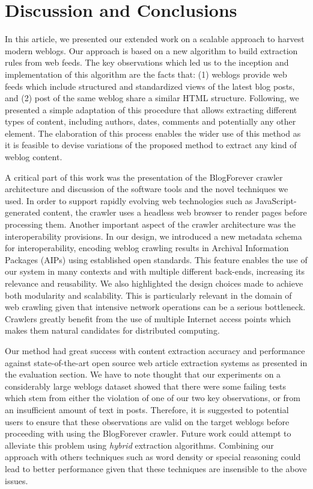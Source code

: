 \section{Discussion and Conclusions}
\label{conclusionandfuturework}
In this article, we presented our extended work on a scalable approach to 
harvest modern weblogs. Our approach is based on a new algorithm to build 
extraction rules from web feeds. The key observations which led us to 
the inception and implementation of this algorithm are the facts that: 
(1) weblogs provide web feeds which include structured and standardized 
views of the latest blog posts, and (2) post of the same weblog share 
a similar HTML structure. Following, we presented a simple adaptation 
of this procedure that allows extracting different types of content, 
including authors, dates, comments and potentially any other element. 
The elaboration of this process enables the wider use of this method 
as it is feasible to devise variations of the proposed method to extract 
any kind of weblog content.

A critical part of this work was the presentation of the BlogForever 
crawler architecture and discussion of the software tools and the novel 
techniques we used. In order to support rapidly evolving web technologies 
such as JavaScript-generated content, the crawler uses a headless web 
browser to render pages before processing them. Another important aspect 
of the crawler architecture was the interoperability provisions. 
In our design, we introduced a new metadata schema for interoperability, 
encoding weblog crawling results in Archival Information Packages (AIPs) 
using established open standards. This feature enables the use of our 
system in many contexts and with multiple different back-ends, increasing 
its relevance and reusability. We also highlighted the design choices 
made to achieve both modularity and scalability. This is particularly 
relevant in the domain of web crawling given that intensive network 
operations can be a serious bottleneck. Crawlers greatly benefit from 
the use of multiple Internet access points which makes them natural 
candidates for distributed computing.

Our method had great success with content extraction accuracy and 
performance against state-of-the-art open source web article extraction 
systems as presented in the evaluation section. We have to note thought 
that our experiments on a considerably large weblogs dataset showed that 
there were some failing tests which stem from either the violation of one 
of our two key observations, or from an insufficient amount of text in 
posts. Therefore, it is suggested to potential users to ensure that these 
observations are valid on the target weblogs before proceeding with using 
the BlogForever crawler. Future work could attempt to alleviate this problem
using \emph{hybrid} extraction algorithms. Combining our approach with
others techniques such as word density or special reasoning could lead
to better performance given that these techniques are insensible to the
above issues.
